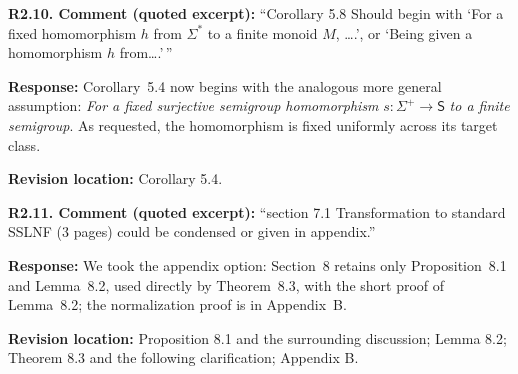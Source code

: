 \documentclass[
  10pt,
  a4paper,
]{article}
\begin{document}
\textbf{R2.10. Comment (quoted excerpt):} ``Corollary 5.8 Should begin with
`For a fixed homomorphism \(h\) from \(\Sigma^*\) to a finite monoid
\(M\), \ldots.', or `Being given a homomorphism \(h\) from\ldots.'\,''

\textbf{Response:} Corollary~5.4 now begins with the analogous
more general assumption: \emph{For a fixed surjective
semigroup homomorphism} $s:\Sigma^+\to\mathsf S$
\emph{to a finite semigroup}. As requested, the
homomorphism is fixed uniformly across its target class.

\textbf{Revision location:} Corollary 5.4.


\textbf{R2.11. Comment (quoted excerpt):} ``section 7.1 Transformation to
standard SSLNF (3 pages) could be condensed or given in appendix.''

\textbf{Response:} We took the appendix option: Section~8 retains only
Proposition~8.1 and Lemma~8.2, used directly by Theorem~8.3, with the
short proof of Lemma~8.2; the normalization proof is in Appendix~B.

\textbf{Revision location:} Proposition 8.1 and the surrounding discussion; Lemma 8.2; Theorem 8.3 and the following clarification; Appendix B.
\end{document}
